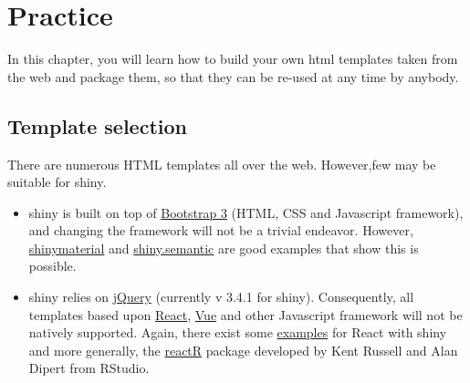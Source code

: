 \documentclass[]{book}
\newenvironment{Shaded}{\begin{snugshade}}{\end{snugshade}}
\newcommand{\DataTypeTok}[1]{\textcolor[rgb]{0.13,0.29,0.53}{#1}}
\newcommand{\KeywordTok}[1]{\textcolor[rgb]{0.13,0.29,0.53}{\textbf{#1}}}
\newcommand{\NormalTok}[1]{#1}
\newcommand{\OperatorTok}[1]{\textcolor[rgb]{0.81,0.36,0.00}{\textbf{#1}}}
\newcommand{\StringTok}[1]{\textcolor[rgb]{0.31,0.60,0.02}{#1}}
\providecommand{\tightlist}{%
  \setlength{\itemsep}{0pt}\setlength{\parskip}{0pt}}
\begin{document}
\begin{Shaded}
\end{Shaded}

\hypertarget{part-practice}{%
\part*{Practice}\label{part-practice}}

In this chapter, you will learn how to build your own html templates taken from the web and package them, so that they can be re-used at any time by anybody.

\hypertarget{custom-templates-selection}{%
\chapter{Template selection}\label{custom-templates-selection}}

There are numerous HTML templates all over the web. However,few may be suitable for shiny.

\begin{itemize}
\tightlist
\item
  shiny is built on top of \href{https://getbootstrap.com/docs/3.3/}{Bootstrap 3} (HTML, CSS and Javascript framework), and changing the framework will not be a trivial endeavor. However, \href{https://github.com/ericrayanderson/shinymaterial}{shinymaterial} and \href{https://github.com/Appsilon/shiny.semantic}{shiny.semantic} are good examples that show this is possible.
\item
  shiny relies on \href{https://jquery.com}{jQuery} (currently v 3.4.1 for shiny). Consequently, all templates based upon \href{https://fr.reactjs.org}{React}, \href{https://vuejs.org}{Vue} and other Javascript framework will not be natively supported. Again, there exist some \href{https://github.com/alandipert/react-widget-demo/blob/master/app.R}{examples} for React with shiny and more generally,
  the \href{https://react-r.github.io/reactR/}{reactR} package developed by Kent Russell and Alan Dipert from RStudio.
\end{itemize}
\end{document}
